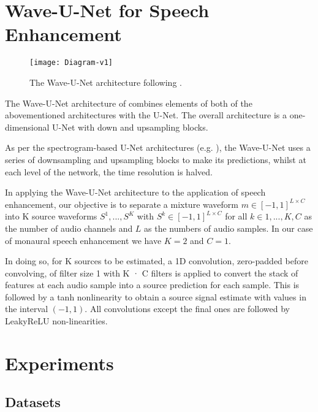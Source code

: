 \documentclass{article}
\begin{document}
\section{Wave-U-Net for Speech Enhancement}\label{sec:wave-u-net}






\begin{figure}
    \centering
    \texttt{[image: Diagram-v1]}
    \caption{The Wave-U-Net architecture following \citep{Stoller2018Wave-U-Net:Separation}.}
    \label{fig:arch}
\end{figure}

The Wave-U-Net architecture of \citep{Stoller2018Wave-U-Net:Separation} combines elements of both of the abovementioned architectures with the U-Net. 
The overall architecture is a one-dimensional U-Net with down and upsampling blocks.

As per the spectrogram-based U-Net architectures (e.g. \citep{Jansson-et-al-2017-Sining}), the  Wave-U-Net uses a series of downsampling and upsampling blocks to make its predictions, whilst at each level of the network, the time resolution is halved. 




In applying the Wave-U-Net architecture to the application of speech enhancement, our objective is to separate a mixture waveform $m \in [-1, 1]^{L \times C}$ into K source waveforms
$S^1, . . .,S^K$
with $S^k \in [-1, 1]^{L \times C}$ for all $k \in {1, . . . , K}, C$ 
as the number of audio channels and $L$ as the numbers of audio samples. 
In our case of monaural speech enhancement we have $K = 2$ and $C = 1$.

In doing so, for K sources to be estimated, a 1D convolution, zero-padded before convolving, of filter size 1 with K · C filters is applied to convert the stack of features at each audio sample into a source prediction for each sample. This is followed by a tanh nonlinearity to obtain a source signal estimate with values in the interval $(-1, 1)$. All convolutions except the final ones are followed by LeakyReLU non-linearities.

\section{Experiments} \label{sec:experiments}

\subsection{Datasets}
\end{document}
